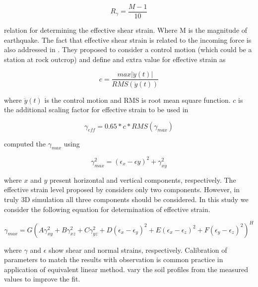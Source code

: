 \begin{equation}
R_{\gamma} = \frac{M-1}{10}
\end{equation}

 relation for determining the effective shear strain. Where M is the magnitude of earthquake. The fact that effective shear strain is related to the incoming force is also addressed in \citet{Lysmer1975}. They proposed to consider a control motion (which could be a station at rock outcrop) and define and extra value for effective strain as 
 
 \begin{equation}
c = \frac{max|\ddot{y}(t)|}{RMS(\ddot{y}(t))}
\end{equation}

where $\ddot{y}(t)$ is the control motion and RMS is root mean square function. $c$ is the additional scaling factor for effective strain to be used in 

\begin{equation}
\gamma_{eff}=0.65*c*RMS(\gamma_{max})
\end{equation}

 \citet{Lysmer1975} computed the $\gamma_{max}$ using
 
 \begin{equation}
 \gamma_{max}^{2} = (\epsilon_{x}-\epsilon{y})^2 + \gamma_{xy}^{2}
 \end{equation}
 
where $x$ and $y$ present horizontal and vertical components, respectively.  The effective strain level proposed by \citet{Lysmer1975} considers only two components. However, in truly 3D simulation all three components should be considered. In this study we consider the following equation for determination of effective strain.

 \begin{equation}
 \gamma_{max} = G(A \gamma_{xy}^{2} + B\gamma_{xz}^{2} + C\gamma_{yz}^{2} + D(\epsilon_{x}-\epsilon_{y})^2 +E(\epsilon_{x}-\epsilon_{z})^2+F(\epsilon_{y}-\epsilon_{z})^2)^H
 \end{equation}
 
 where $\gamma$ and $\epsilon$ show shear and normal strains, respectively. Calibration of parameters to match the results with observation is common practice in application of equivalent linear method.  \citet{Assimaki2006attenuation} vary the soil profiles from the measured values to improve the fit. 

 
